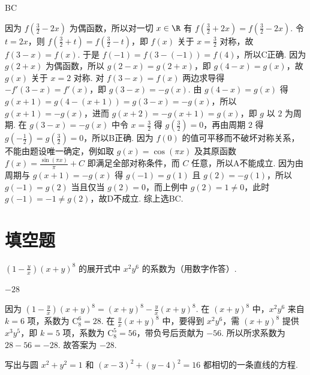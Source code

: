 \begin{answer}
BC
\end{answer}

\begin{solution}
因为 \(f\left(\frac{3}{2}-2x\right)\) 为偶函数，所以对一切 \(x\in\R\) 有 \(f\left(\frac{3}{2}+2x\right)=f\left(\frac{3}{2}-2x\right)\). 令 \(t=2x\)，则 \(f\left(\frac{3}{2}+t\right)=f\left(\frac{3}{2}-t\right)\)，即 \(f(x)\) 关于 \(x=\frac{3}{2}\) 对称，故 \(f(3-x)=f(x)\). 于是 \(f(-1)=f(3-(-1))=f(4)\)，所以C正确. 因为 \(g(2+x)\) 为偶函数，所以 \(g(2-x)=g(2+x)\)，即 \(g(4-x)=g(x)\)，故 \(g(x)\) 关于 \(x=2\) 对称. 对 \(f(3-x)=f(x)\) 两边求导得 \(-f'(3-x)=f'(x)\)，即 \(g(3-x)=-g(x)\). 由 \(g(4-x)=g(x)\) 得 \(g(x+1)=g(4-(x+1))=g(3-x)=-g(x)\)，所以 \(g(x+1)=-g(x)\)，进而 \(g(x+2)=-g(x+1)=g(x)\)，即 \(g\) 以 \(2\) 为周期. 在 \(g(3-x)=-g(x)\) 中令 \(x=\frac{3}{2}\) 得 \(g\left(\frac{3}{2}\right)=0\)，再由周期 \(2\) 得 \(g\left(-\frac{1}{2}\right)=g\left(\frac{3}{2}\right)=0\)，所以B正确. 因为 \(f(0)\) 的值可平移而不破坏对称关系，不能由题设唯一确定，例如取 \(g(x)=\cos(\pi x)\) 及其原函数 \(f(x)=\frac{\sin(\pi x)}{\pi}+C\) 即满足全部对称条件，而 \(C\) 任意，所以A不能成立. 因为由周期与 \(g(x+1)=-g(x)\) 得 \(g(-1)=g(1)\) 且 \(g(2)=-g(1)\)，所以 \(g(-1)=g(2)\) 当且仅当 \(g(2)=0\)，而上例中 \(g(2)=1\ne 0\)，此时 \(g(-1)=-1\ne g(2)\)，故D不成立. 综上选BC.
\end{solution}
\section{填空题}

\begin{problem}
\( \left(1-\frac{y}{x}\right)(x+y)^8 \) 的展开式中 \(x^2y^6\) 的系数为\fillinblank{}（用数字作答）.
\end{problem}

\begin{answer}
\(-28\)
\end{answer}

\begin{solution}
因为 \(\left(1-\frac{y}{x}\right)(x+y)^8=(x+y)^8-\frac{y}{x}(x+y)^8\). 在 \((x+y)^8\) 中，\(x^2y^6\) 来自 \(k=6\) 项，系数为 \(\mathrm C_8^6=28\). 在 \(\frac{y}{x}(x+y)^8\) 中，要得到 \(x^2y^6\)，需 \((x+y)^8\) 提供 \(x^3y^5\)，即 \(k=5\) 项，系数为 \(\mathrm C_8^5=56\)，带负号后贡献为 \(-56\). 所以所求系数为 \(28-56=-28\). 故答案为 \(-28\).
\end{solution}

\begin{problem}
写出与圆 \(x^2+y^2=1\) 和 \((x-3)^2+(y-4)^2=16\) 都相切的一条直线的方程\fillinblank{}.
\end{problem}

